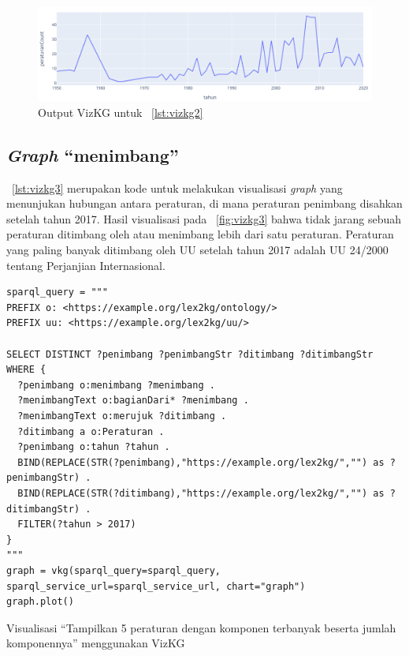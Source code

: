 \begin{figure}[H]
  \centering
  \includegraphics[width=\textwidth]{pictures/vizkg2.png}
  \caption{Output VizKG untuk \lst~\ref{lst:vizkg2}}
  \label{fig:vizkg2}
\end{figure}

\subsection{\textit{Graph} ``menimbang''}
\label{subsec:graph}

\lst~\ref{lst:vizkg3} merupakan kode untuk melakukan visualisasi \textit{graph} yang menunjukan
hubungan  antara peraturan, di mana peraturan penimbang disahkan setelah tahun
2017. Hasil visualisasi pada \pic~\ref{fig:vizkg3} bahwa tidak jarang sebuah peraturan ditimbang
oleh atau menimbang lebih dari satu peraturan. Peraturan yang paling banyak ditimbang oleh UU
setelah tahun 2017 adalah UU 24/2000 tentang Perjanjian Internasional.

\begin{listing}[H]
  \begin{verbatim}
sparql_query = """
PREFIX o: <https://example.org/lex2kg/ontology/>
PREFIX uu: <https://example.org/lex2kg/uu/>

SELECT DISTINCT ?penimbang ?penimbangStr ?ditimbang ?ditimbangStr
WHERE {
  ?penimbang o:menimbang ?menimbang .
  ?menimbangText o:bagianDari* ?menimbang .
  ?menimbangText o:merujuk ?ditimbang .
  ?ditimbang a o:Peraturan .
  ?penimbang o:tahun ?tahun .
  BIND(REPLACE(STR(?penimbang),"https://example.org/lex2kg/","") as ?penimbangStr) .
  BIND(REPLACE(STR(?ditimbang),"https://example.org/lex2kg/","") as ?ditimbangStr) .
  FILTER(?tahun > 2017)
}
"""
graph = vkg(sparql_query=sparql_query, sparql_service_url=sparql_service_url, chart="graph")
graph.plot()
  \end{verbatim}
  \caption{Visualisasi ``Tampilkan 5 peraturan dengan komponen terbanyak beserta jumlah komponennya'' menggunakan VizKG}
  \label{lst:vizkg3}
\end{listing}

